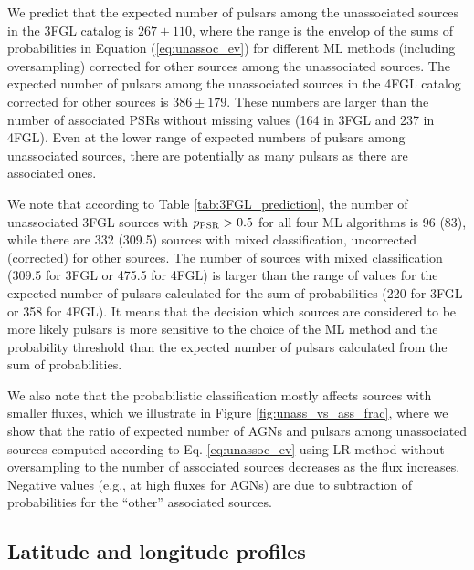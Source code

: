 We predict that the expected number of pulsars among the unassociated sources in the 3FGL catalog
is $267 \pm 110$, where the range is the envelop of the sums of probabilities in Equation (\ref{eq:unassoc_ev})
for different ML methods (including oversampling) corrected for other sources among the unassociated sources.
The expected number of pulsars among the unassociated sources in the 4FGL catalog corrected for other sources is 
$386 \pm 179$.
These numbers are larger than the number of associated PSRs without missing values (164 in 3FGL and 237 in 4FGL).
Even at the lower range of expected numbers of pulsars among unassociated sources, there are potentially as many pulsars
as there are associated ones.

We note that according to Table \ref{tab:3FGL_prediction}, the number of unassociated 3FGL sources 
with $p_{\rm PSR} > 0.5$ for all four ML algorithms is 96 (83), while there are 332 (309.5) sources with mixed classification,
uncorrected (corrected) for other sources.
The number of sources with mixed classification (309.5 for 3FGL or 475.5 for 4FGL)
is larger than the range of values for the expected number of pulsars calculated for the sum of probabilities 
(220 for 3FGL or 358 for 4FGL).
It means that the decision which sources are considered to be more likely pulsars is more sensitive to the choice of the ML method
and the probability threshold than the expected number of pulsars calculated from the sum of probabilities.

We also note that the probabilistic classification mostly affects sources with smaller fluxes,
which we illustrate in Figure \ref{fig:unass_vs_ass_frac}, where we show that the ratio of expected number of AGNs and pulsars among 
unassociated sources computed according to Eq. \ref{eq:unassoc_ev} using LR method without oversampling to the number of associated 
sources decreases as the flux increases.
Negative values (e.g., at high fluxes for AGNs) are due to subtraction of probabilities for the ``other'' associated sources.

\subsection{Latitude and longitude profiles}

